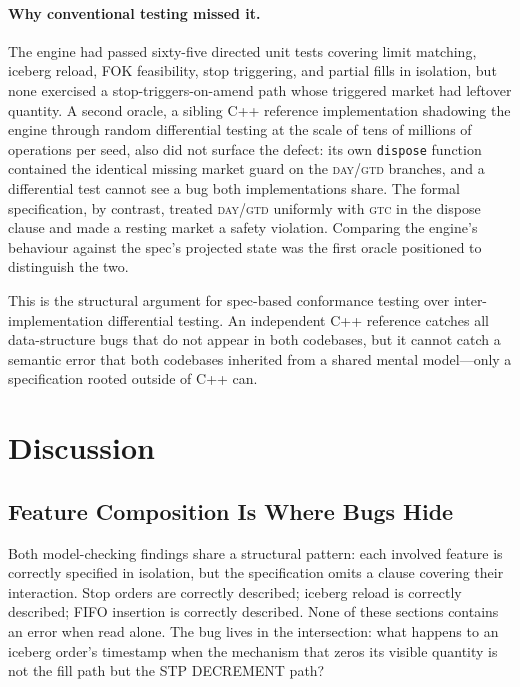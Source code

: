 \documentclass[11pt,a4paper]{article}
\begin{document}
\paragraph{Why conventional testing missed it.} The engine had
passed sixty-five directed unit tests covering limit matching,
iceberg reload, FOK feasibility, stop triggering, and partial
fills in isolation, but none exercised a stop-triggers-on-amend
path whose triggered market had leftover quantity. A second
oracle, a sibling C++ reference implementation shadowing the
engine through random differential testing at the scale of tens
of millions of operations per seed, also did not surface the
defect: its own \texttt{dispose} function contained the identical
missing market guard on the \textsc{day}/\textsc{gtd} branches,
and a differential test cannot see a bug both implementations
share. The formal specification, by contrast, treated
\textsc{day}/\textsc{gtd} uniformly with \textsc{gtc} in the
dispose clause and made a resting market a safety violation.
Comparing the engine's behaviour against the spec's projected
state was the first oracle positioned to distinguish the two.

This is the structural argument for spec-based conformance
testing over inter-implementation differential testing. An
independent C++ reference catches all data-structure bugs that
do not appear in both codebases, but it cannot catch a semantic
error that both codebases inherited from a shared mental
model---only a specification rooted outside of C++ can.


\section{Discussion}
\label{sec:lessons}

\subsection{Feature Composition Is Where Bugs Hide}
\label{sec:lessons-composition}

Both model-checking findings share a structural pattern: each involved
feature is correctly specified in isolation, but the specification omits
a clause covering their interaction. Stop orders are correctly
described; iceberg reload is correctly described; FIFO insertion is
correctly described. None of these sections contains an error when read
alone. The bug lives in the intersection: what happens to an iceberg
order's timestamp when the mechanism that zeros its visible quantity is
not the fill path but the STP DECREMENT path?
\end{document}
